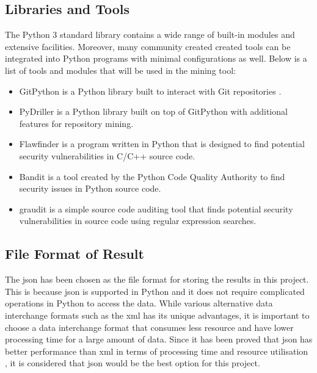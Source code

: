 \documentclass[12pt, a4paper]{report}
\begin{document}
\subsection{Libraries and Tools}
The Python 3 standard library contains a wide range of built-in modules and extensive facilities.
Moreover, many community created created tools can be integrated into Python programs with minimal
configurations as well. Below is a list of tools and modules that will be used in the mining tool:
\begin{itemize}
  \item GitPython is a Python library built to interact with Git repositories \cite{gitpython}.
  \item PyDriller \cite{pydriller_repo, spadini_2018} is a Python library built on top of GitPython
  with additional features for repository mining.
  \item Flawfinder \cite{flawfinder} is a program written in Python that is designed to find
  potential security vulnerabilities in C/C++ source code.
  \item Bandit \cite{bandit} is a tool created by the Python Code Quality Authority to find security
  issues in Python source code.
  \item graudit \cite{graudit} is a simple source code auditing tool that finds potential security
  vulnerabilities in source code using regular expression searches.
\end{itemize}

\subsection{File Format of Result} \label{subsec:file_format}
The \acrfull{json} \cite{json} has been chosen as the file format for storing the results in this
project. This is because \acrshort{json} is supported in Python and it does not require complicated
operations in Python to access the data. While various alternative data interchange formats such as
the \acrfull{xml} \cite{xml} has its unique advantages, it is important to choose a data interchange
format that consumes less resource and have lower processing time for a large amount of data. Since
it has been proved that \acrshort{json} has better performance than \acrshort{xml} in terms of
processing time and resource utilisation \cite{nurseitov_2009}, it is considered that
\acrshort{json} would be the best option for this project.
\end{document}
